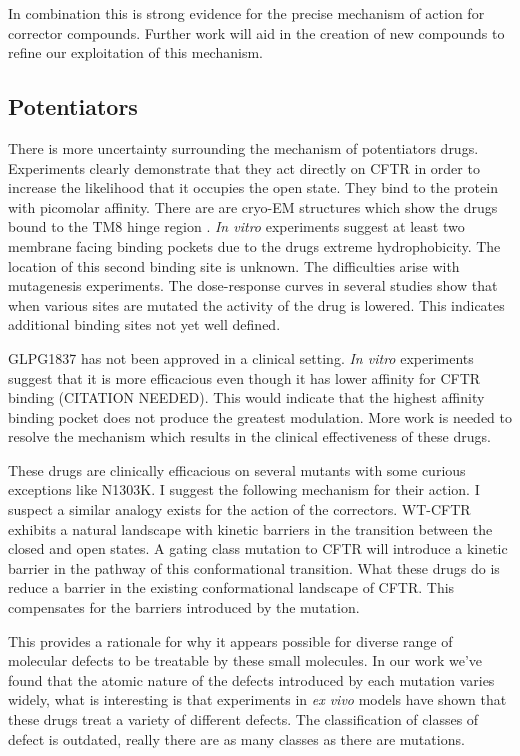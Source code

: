 In combination this is strong evidence for the precise mechanism of action for corrector compounds. Further work will aid in the creation of new compounds to refine our exploitation of this mechanism.

\subsection{Potentiators}
There is more uncertainty surrounding the mechanism of potentiators drugs. Experiments clearly demonstrate that they act directly on CFTR in order to increase the likelihood that it occupies the open state. They bind to the protein with picomolar affinity. There are are cryo-EM structures which show the drugs bound to the TM8 hinge region \cite{}. \textit {In vitro} experiments suggest at least two membrane facing binding pockets due to the drugs extreme hydrophobicity\cite{}. The location of this second binding site is unknown. The difficulties arise with mutagenesis experiments. The dose-response curves in several studies show that when various sites are mutated the activity of the drug is lowered. This indicates additional binding sites not yet well defined. 

GLPG1837 has not been approved in a clinical setting. \textit {In vitro} experiments suggest that it is more efficacious even though it has lower affinity for CFTR binding (CITATION NEEDED). This would indicate that the highest affinity binding pocket does not produce the greatest modulation. More work is needed to resolve the mechanism which results in the clinical effectiveness of these drugs.  

These drugs are clinically efficacious \cite{VanGoor2014} on several mutants with some curious exceptions like N1303K. I suggest the following mechanism for their action. I suspect a similar analogy exists for the action of the correctors. WT-CFTR exhibits a natural landscape with kinetic barriers in the transition between the closed and open states. A gating class mutation to CFTR will introduce a kinetic barrier in the pathway of this conformational transition. What these drugs do is reduce a barrier in the existing conformational landscape of CFTR. This compensates for the barriers introduced by the mutation. 

This provides a rationale for why it appears possible for diverse range of molecular defects to be treatable by these small molecules. In our work we've found that the atomic nature of the defects introduced by each mutation varies widely, what is interesting is that experiments in \textit{ex vivo} models have shown that these drugs treat a variety of different defects. The classification of classes of defect is outdated, really there are as many classes as there are mutations.



